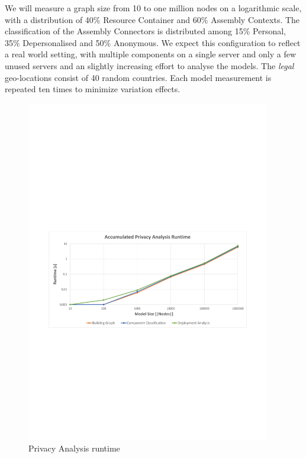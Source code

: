 We will measure a graph size from 10 to one million nodes on a logarithmic scale, with a distribution of 40\% Resource Container and 60\% Assembly Contexts. The classification of the Assembly Connectors is distributed among 15\% Personal, 35\% Depersonalised and 50\% Anonymous. We expect this configuration to reflect a real world setting, with multiple components on a single server and only a few unused servers and an slightly increasing effort to analyse the models. The \textit{legal} geo-locations consist of 40 random countries. Each model measurement is repeated ten times to minimize variation effects.

\begin{figure}[h]
	\centering
	\includegraphics[trim = 15mm 95mm 13mm 110mm, clip, width=0.95\textwidth]{graphs/Runtime_pa}
	\caption{Privacy Analysis runtime}
	\label{fig:eval:pa:runtime}
\end{figure}


